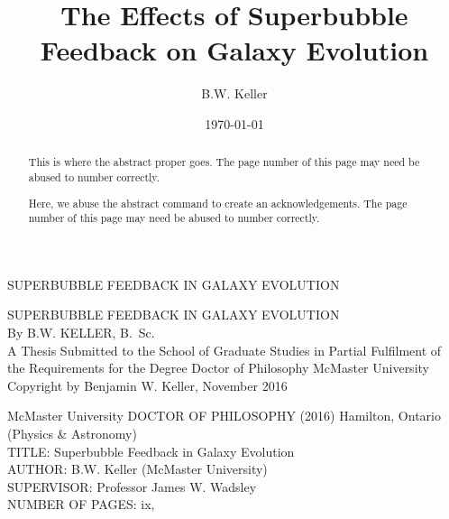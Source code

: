 \documentclass[letterpaper,12pt,twoside,openright]{report} %
\title{The Effects of Superbubble Feedback on Galaxy Evolution}
\author{B.W. Keller}
\date{\today}
\begin{document}
\begin{titlepage} %
    \thispagestyle{empty}
    \vspace*{\fill}
    \begin{center}{\Large
    \uppercase{Superbubble Feedback in Galaxy Evolution}}
    \end{center}
    \vspace*{\fill}
    \setcounter{page}{0} %
\end{titlepage}

\begin{titlepage} %
\thispagestyle{empty}
\centering
\vspace*{\fill} %
{\Large \uppercase{Superbubble Feedback in Galaxy Evolution}\\
\vfill
By B.W. KELLER, B.\ Sc.\\}
\vfill
A Thesis Submitted to the School of Graduate Studies in Partial Fulfilment of
the Requirements for the Degree Doctor of Philosophy
\vfill%
McMaster University \textcopyright{} Copyright by Benjamin W. Keller, November 2016
\end{titlepage}
{\noindent McMaster University DOCTOR OF PHILOSOPHY (2016) Hamilton, Ontario
(Physics \& Astronomy)\\
TITLE: Superbubble Feedback in Galaxy Evolution\\
AUTHOR: B.W. Keller (McMaster University)\\
SUPERVISOR: Professor James W. Wadsley\\
NUMBER OF PAGES: ix,~\pageref{LastPage}}
    \begin{abstract}
        \thispagestyle{plain}
        \setcounter{page}{3}
            This is where the abstract proper goes. The page number of this page may need be abused to number correctly.
    \end{abstract}

    \renewcommand{\abstractname}{Acknowledgements}
    \begin{abstract} \setcounter{page}{4} \thispagestyle{plain}
        Here, we abuse the abstract command to create an acknowledgements. The page number of this page may need be abused to number correctly.
    \end{abstract}
    
\end{document}
